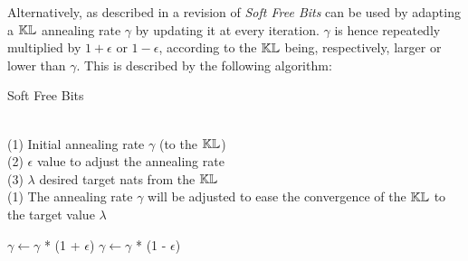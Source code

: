 Alternatively, as described in a revision of \cite{1611.02731} \emph{Soft Free Bits}
can be used by adapting a $\mathbb{KL}$ annealing rate $\gamma$ by updating it
at every iteration.
$\gamma$ is hence repeatedly multiplied by $1+\epsilon$ or $1-\epsilon$,
according to the $\mathbb{KL}$ being, respectively, larger or lower than $\gamma$.
This is described by the following algorithm:

\begin{algorithm}
\caption{Soft Free Bits}
\begin{algorithmic}[1]

\REQUIRE ~~\\
(1) Initial annealing rate $\gamma$ (to the $\mathbb{KL}$) \\
(2) $\epsilon$ value to adjust the annealing rate \\
(3) $\lambda$ desired target nats from the $\mathbb{KL}$
\ENSURE~~\\
(1) The annealing rate $\gamma$ will be adjusted to ease the convergence of the $\mathbb{KL}$
to the target value $\lambda$

\item[]
\IF{$\justkl > \lambda$}
    \STATE $\gamma \leftarrow \gamma$ * (1 + $\epsilon$)
\ELSE
    \STATE $\gamma \leftarrow \gamma$ * (1 - $\epsilon$)
\ENDIF
\end{algorithmic}
\end{algorithm}




